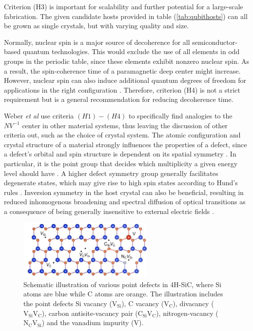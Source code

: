 Criterion (H3) is important for scalability and further potential for a large-scale fabrication. The given candidate hosts provided in table (\ref{tab:qubithosts}) can all be grown as single crystals, but with varying quality and size.

Normally, nuclear spin is a major source of decoherence for all semiconductor-based quantum technologies. This would exclude the use of all elements in odd groups in the periodic table, since these elements exhibit nonzero nuclear spin. As a result, the spin-coherence time of a paramagnetic deep center \cite{Weber2010} might increase. However, nuclear spin can also induce additional quantum degrees of freedom for applications in the right configuration \cite{Bassett2019}. Therefore, criterion (H4) is not a strict requirement but is a general recommendation for reducing decoherence time.  %


Weber \textit{et al} \cite{Weber2010} use criteria $(H1)-(H4)$ to specifically find analogies to the $NV^{-1}$ center in other material systems, thus leaving the discussion of other criteria out, such as the choice of crystal system. The atomic configuration and crystal structure of a material strongly influences the properties of a defect, since a defect's orbital and spin structure is dependent on its spatial symmetry \cite{Bassett2019}. In particular, it is the point group that decides which multiplicity a given energy level should have \cite{James1976}. A higher defect symmetry group generally facilitates degenerate states, which may give rise to high spin states according to Hund's rules \cite{Bassett2019, Togan2010}. Inversion symmetry in the host crystal can also be beneficial, resulting in reduced inhomogenous broadening and spectral diffusion of optical transitions as a consequence of being generally insensitive to external electric fields \cite{Bassett2019}.

\begin{figure}
  \centering
  \includegraphics[width=0.6\textwidth]{theory/figures/4H-SiC.png}
  \caption{Schematic illustration of various point defects in 4H-SiC, where Si atoms are blue while C atoms are orange. The illustration includes the point defects Si vacancy ($\text{V}_{\text{Si}}$), C vacancy ($\text{V}_{\text{C}}$), divacancy ($\text{V}_{\text{Si}}\text{V}_{\text{C}}$), carbon antisite-vacancy pair ($\text{C}_{\text{Si}}\text{V}_{\text{C}}$), nitrogen-vacancy ($\text{N}_{\text{C}}\text{V}_{\text{Si}}$) and the vanadium impurity ($\text{V}$). }
  \label{fig:4H-SiC}
\end{figure}

